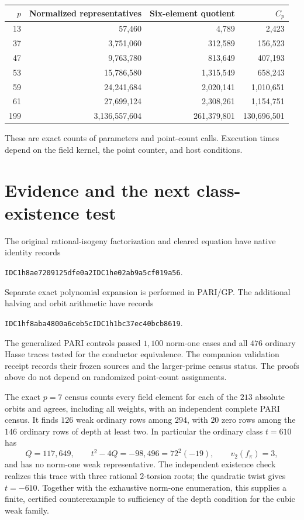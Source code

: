 \documentclass[11pt]{article}
\begin{document}
\begin{center}
\begin{tabular}{rrrr}
\toprule
$p$&Normalized representatives&Six-element quotient&$C_p$\\
\midrule
13&57,460&4,789&2,423\\
37&3,751,060&312,589&156,523\\
47&9,763,780&813,649&407,193\\
53&15,786,580&1,315,549&658,243\\
59&24,241,684&2,020,141&1,010,651\\
61&27,699,124&2,308,261&1,154,751\\
199&3,136,557,604&261,379,801&130,696,501\\
\bottomrule
\end{tabular}
\end{center}
These are exact counts of parameters and point-count calls. Execution
times depend on the field kernel, the point counter, and host conditions.

\section{Evidence and the next class-existence test}
The original rational-isogeny factorization and cleared equation have
native identity records
\begin{center}
\texttt{IDC1h8ae7209125dfe0a2}\quad\texttt{IDC1he02ab9a5cf019a56}.
\end{center}
Separate exact polynomial expansion is performed in PARI/GP.
The additional halving and orbit arithmetic have records
\begin{center}
\texttt{IDC1hf8aba4800a6ceb5c}\quad\texttt{IDC1h1bc37ec40bcb8619}.
\end{center}
The generalized PARI controls passed $1{,}100$ norm-one cases and
all $476$ ordinary Hasse traces tested for the conductor equivalence.
The companion validation receipt records their frozen sources and the
larger-prime census status. The proofs above do not
depend on randomized point-count assignments.

The exact $p=7$ census counts every field element for each of the $213$
absolute orbits and agrees, including all weights, with an independent
complete PARI census. It finds $126$ weak ordinary rows among $294$,
with $20$ zero rows among the $146$ ordinary rows of depth at least two.
In particular the ordinary class $t=610$ has
\[
 Q=117{,}649,\qquad t^2-4Q=-98{,}496=72^2(-19),
 \qquad v_2(f_\pi)=3,
\]
and has no norm-one weak representative. The independent existence
check realizes this trace with three rational $2$-torsion roots; the
quadratic twist gives $t=-610$. Together with the exhaustive norm-one
enumeration, this supplies a finite, certified counterexample to
sufficiency of the depth condition for the cubic weak family.
\end{document}
